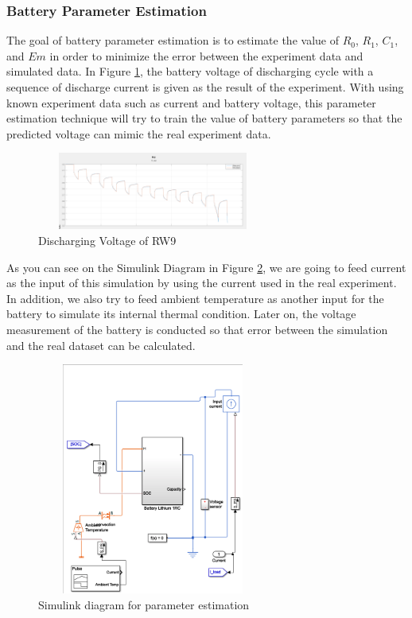\subsubsection{Battery Parameter Estimation}

The goal of battery parameter estimation is to estimate the value of $R_0$, $R_1$, $C_1$, and $Em$ in order to minimize the error between the experiment data and simulated data. In Figure \ref{fig:discharging_voltage_RW9}, the battery voltage of discharging cycle with a sequence of discharge current is given as the result of the experiment. 
With using known experiment data such as current and battery voltage, this parameter estimation technique will try to train the value of battery parameters so that the predicted voltage can mimic the real experiment data.

\begin{figure}
\includegraphics[height=1in, width=3in]{figures/Discharging_01}
\caption{Discharging Voltage of RW9}
\label{fig:discharging_voltage_RW9}
\end{figure}

As you can see on the Simulink Diagram in Figure \ref{fig:simulink_params}, we are going to feed current as the input of this simulation by using the current used in the real experiment. In addition, we also try to feed ambient temperature as another input for the battery to simulate its internal thermal condition. Later on, the voltage measurement of the battery is conducted so that error between the simulation and the real dataset can be calculated.

\begin{figure}
\includegraphics[height=3in, width=3in]{figures/Simulink_params}
\caption{Simulink diagram for parameter estimation}
\label{fig:simulink_params}
\end{figure}

